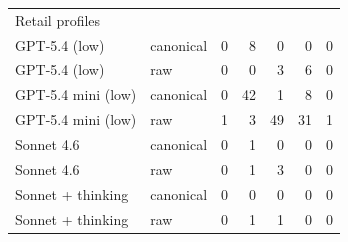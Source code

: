 \begin{table}[t]
\begin{tabular}{llrrrrr}
\multicolumn{7}{l}{Retail profiles} \\
GPT-5.4 (low) & canonical & 0 & 8 & 0 & 0 & 0 \\
GPT-5.4 (low) & raw & 0 & 0 & 3 & 6 & 0 \\
GPT-5.4 mini (low) & canonical & 0 & 42 & 1 & 8 & 0 \\
GPT-5.4 mini (low) & raw & 1 & 3 & 49 & 31 & 1 \\
Sonnet 4.6 & canonical & 0 & 1 & 0 & 0 & 0 \\
Sonnet 4.6 & raw & 0 & 1 & 3 & 0 & 0 \\
Sonnet + thinking & canonical & 0 & 0 & 0 & 0 & 0 \\
Sonnet + thinking & raw & 0 & 1 & 1 & 0 & 0 \\
\bottomrule
\end{tabular}
\end{table}
